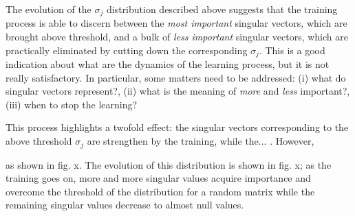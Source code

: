 \documentclass[twocolumn]{article}
\begin{document}
The evolution of the \(\sigma_j\) distribution described above suggests that the training process is able to discern between the \textit{most important} singular vectors, which are brought above threshold, and a bulk of \textit{less important} singular vectors, which are practically eliminated by cutting down the corresponding \(\sigma_j\). This is a good indication about what are the dynamics of the learning process, but it is not really satisfactory. In particular, some matters need to be addressed: (i) what do singular vectors represent?, (ii) what is the meaning of \textit{more} and \textit{less} important?, (iii) when to stop the learning?




This process highlights a twofold effect: the singular vectors corresponding to the above threshold \(\sigma_j\) are strengthen by the training, while the... . However,

 as shown in fig. x. The evolution of this distribution is shown in fig. x; as the training goes on, more and more singular values acquire importance and overcome the threshold of the distribution for a random matrix while the remaining singular values decrease to almost null values.



\end{document}
